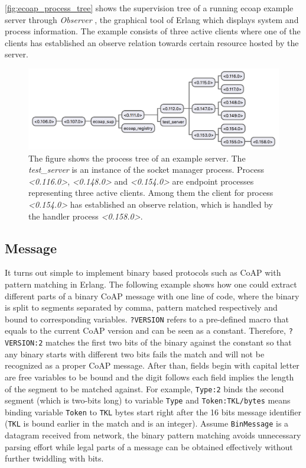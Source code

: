 \autoref{fig:ecoap_process_tree} shows the supervision tree of a running ecoap example server through \textit{Observer} \autocite{erlang_observer}, the graphical tool of Erlang which displays system and process information. The example consists of three active clients where one of the clients has established an observe relation towards certain resource hosted by the server. 

\begin{figure}[!htbp]
\centering
\includegraphics[scale = 0.6]{ecoap_process_tree}
\caption[Process tree of an example server]{The figure shows the process tree of an example server. The 
\textit{test\_server} is an instance of the socket manager process. Process \textit{<0.116.0>},  \textit{<0.148.0>} and \textit{<0.154.0>} are endpoint processes representing three active clients. Among them the client for process \textit{<0.154.0>} has established an observe relation, which is handled by the handler process \textit{<0.158.0>}.}
\label{fig:ecoap_process_tree}
\end{figure}

\subsection{Message}

It turns out simple to implement binary based protocols such as CoAP with pattern matching in Erlang. The following example shows how one could extract different parts of a binary CoAP message with one line of code, where the binary is split to segments separated by comma, pattern matched respectively and bound to corresponding variables. \verb|?VERSION| refers to a pre-defined macro that equals to the current CoAP version and can be seen as a constant. Therefore, \verb|?VERSION:2| matches the first two bits of the binary against the constant so that any binary starts with different two bits fails the match and will not be recognized as a proper CoAP message. After than, fields begin with capital letter are free variables to be bound and the digit follows each field implies the length of the segment to be matched against. For example, \verb|Type:2| binds the second segment (which is two-bits long) to variable \verb|Type| and \verb|Token:TKL/bytes| means binding variable \verb|Token| to \verb|TKL| bytes start right after the 16 bits message identifier (\verb|TKL| is bound earlier in the match and is an integer).  Assume \verb|BinMessage| is a datagram received from network, the binary pattern matching avoids unnecessary parsing effort while legal parts of a message can be obtained effectively without further twiddling with bits. 

